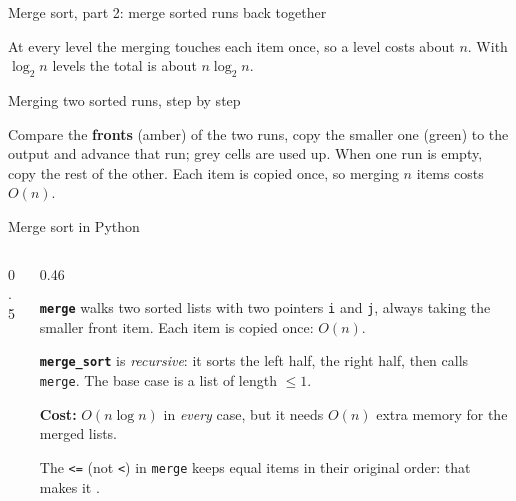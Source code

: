 \documentclass[aspectratio=169,10pt]{beamer}
\begin{document}
\begin{frame}{Merge sort, part 2: merge sorted runs back together}
\begin{sfig}[0.72]
\begin{tikzpicture}
  
\end{tikzpicture}
\end{sfig}
\vspace{1mm}
{\small At every level the merging touches each item once, so a level costs about $n$. With $\log_2 n$ levels the total is about $n\log_2 n$.}
\end{frame}

\begin{frame}{Merging two sorted runs, step by step}
\begin{sfig}[0.7]
\begin{tikzpicture}
  
\end{tikzpicture}
\end{sfig}
\vspace{1mm}
{\small Compare the \textbf{fronts} (amber) of the two runs, copy the smaller one (green) to the output and advance that run; grey cells are used up. When one run is empty, copy the rest of the other. Each item is copied once, so merging $n$ items costs $O(n)$.}
\end{frame}

\begin{frame}{Merge sort in Python}
\begin{columns}[T]
\begin{column}{0.5\textwidth}
\vspace{1mm}
\end{column}
\begin{column}{0.46\textwidth}
{\small
\textbf{\texttt{merge}} walks two sorted lists with two pointers \texttt{i} and \texttt{j}, always taking the smaller front item. Each item is copied once: $O(n)$.

\vspace{2mm}
\textbf{\texttt{merge\_sort}} is \emph{recursive}: it sorts the left half, the right half, then calls \texttt{merge}. The base case is a list of length $\le 1$.

\vspace{2mm}
\textbf{Cost:} $O(n\log n)$ in \emph{every} case, but it needs $O(n)$ extra memory for the merged lists.

\vspace{2mm}
The \texttt{<=} (not \texttt{<}) in \texttt{merge} keeps equal items in their original order: that makes it .}
\end{column}
\end{columns}
\end{frame}
\end{document}

